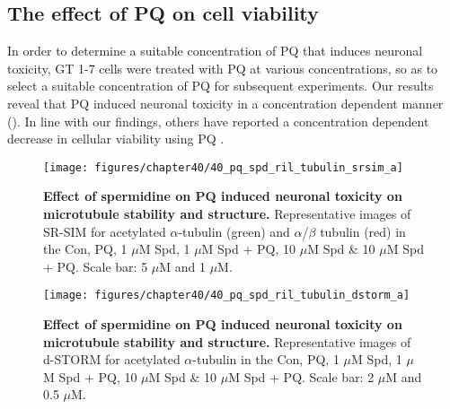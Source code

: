 \subsection{ The effect of PQ on cell viability}
In order to determine a suitable concentration of PQ that induces neuronal toxicity, GT 1-7 cells were treated with PQ at various concentrations, so as to select a suitable concentration of PQ for subsequent experiments. Our results reveal that PQ induced neuronal toxicity in a concentration dependent manner (). In line with our findings, others have reported a concentration dependent decrease in cellular viability using PQ \citep{Chen2012b,Jaroonwitchawan2017,Mehdi2013}. 

\begin{landscape}\centering
\begin{figure}[!htbp]
\vspace*{\fill}
\centering
  \texttt{[image: figures/chapter40/40\_pq\_spd\_ril\_tubulin\_srsim\_a]}
  \caption[Effect of spermidine on PQ induced neuronal toxicity on microtubule stability and structure]{\textbf{Effect of spermidine on PQ induced neuronal toxicity on microtubule stability and structure.} Representative images of SR-SIM for acetylated $\alpha$-tubulin (green) and $\alpha$/$\beta$ tubulin (red) in the Con, PQ, 1 $\mu$M Spd, 1 $\mu$M Spd + PQ, 10 $\mu$M Spd \& 10 $\mu$M Spd + PQ. Scale bar: 5 $\mu$M and 1 $\mu$M.}
  \label{fig:40_pq_spd_ril_tubulin_srsim_a}
\end{figure} 
\vfill
\end{landscape}

\begin{landscape}
\begin{figure}[!htbp]
\center
  \texttt{[image: figures/chapter40/40\_pq\_spd\_ril\_tubulin\_dstorm\_a]}
  \caption[Effect of spermidine on PQ induced neuronal toxicity on microtubule stability and structure]{\textbf{Effect of spermidine on PQ induced neuronal toxicity on microtubule stability and structure.} Representative images of d-STORM for acetylated $\alpha$-tubulin in the Con, PQ, 1 $\mu$M Spd, 1 $\mu$M Spd + PQ, 10 $\mu$M Spd \& 10 $\mu$M Spd + PQ. Scale bar: 2 $\mu$M and 0.5 $\mu$M.}
  \label{fig:40_pq_spd_ril_tubulin_dstorm_a}
\end{figure} 
\end{landscape}

